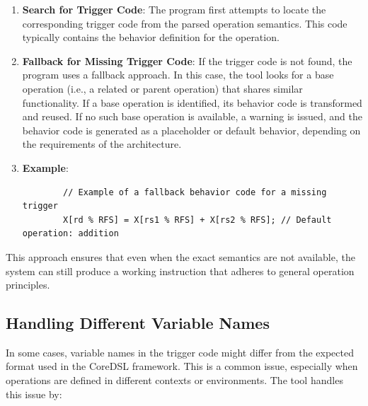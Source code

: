 \begin{enumerate}
    \item \textbf{Search for Trigger Code}: The program first attempts to locate the corresponding trigger code from the parsed operation semantics. This code typically contains the behavior definition for the operation.

    \item \textbf{Fallback for Missing Trigger Code}: If the trigger code is not found, the program uses a fallback approach. In this case, the tool looks for a base operation (i.e., a related or parent operation) that shares similar functionality. If a base operation is identified, its behavior code is transformed and reused. If no such base operation is available, a warning is issued, and the behavior code is generated as a placeholder or default behavior, depending on the requirements of the architecture.

    \item \textbf{Example}:
    \begin{lstlisting}
        // Example of a fallback behavior code for a missing trigger
        X[rd % RFS] = X[rs1 % RFS] + X[rs2 % RFS]; // Default operation: addition
    \end{lstlisting}
\end{enumerate}

This approach ensures that even when the exact semantics are not available, the system can still produce a working instruction that adheres to general operation principles.

\subsection{Handling Different Variable Names}

In some cases, variable names in the trigger code might differ from the expected format used in the CoreDSL framework. This is a common issue, especially when operations are defined in different contexts or environments. The tool handles this issue by:

